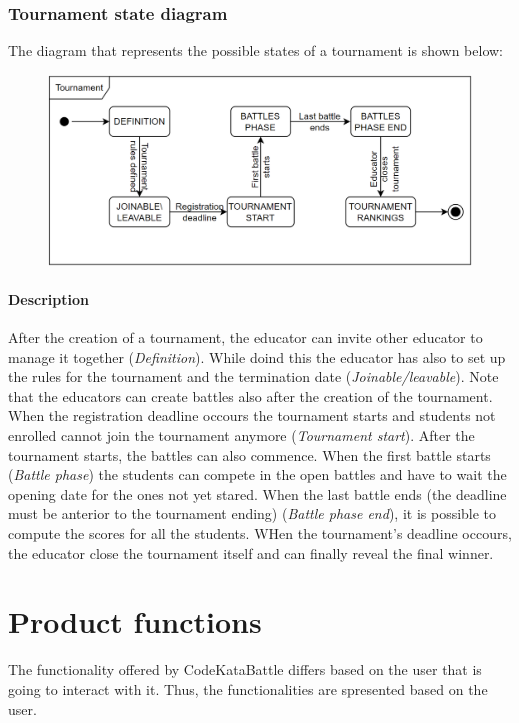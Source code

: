 \documentclass[12pt, a4paper]{report}
\begin{document}
    \subsubsection{Tournament state diagram}
    The diagram that represents the possible states of a tournament is shown below: 
    \begin{figure}[H]
        \centering
        \includegraphics[width=0.75\linewidth]{images/tournament.png}
    \end{figure}

    \paragraph*{Description}
    After the creation of a tournament, the educator can invite other educator to manage it together (\textit{Definition}). 
    While doind this the educator has also to set up the rules for the tournament and the termination date (\textit{Joinable/leavable}).
    Note that the educators can create battles also after the creation of the tournament.
    When the registration deadline occours the tournament starts and students not enrolled cannot join the tournament anymore (\textit{Tournament start}). 
    After the tournament starts, the battles can also commence. 
    When the first battle starts (\textit{Battle phase}) the students can compete in the open battles and have to wait the opening date for the ones not yet stared. 
    When the last battle ends (the deadline must be anterior to the tournament ending) (\textit{Battle phase end}), it is possible to compute the scores for all the students. 
    WHen the tournament's deadline occours, the educator close the tournament itself and can finally reveal the final winner. 

    \section{Product functions}
    The functionality offered by CodeKataBattle differs based on the user that is going to interact with it. 
    Thus, the functionalities are spresented based on the user. 
    
\end{document}
